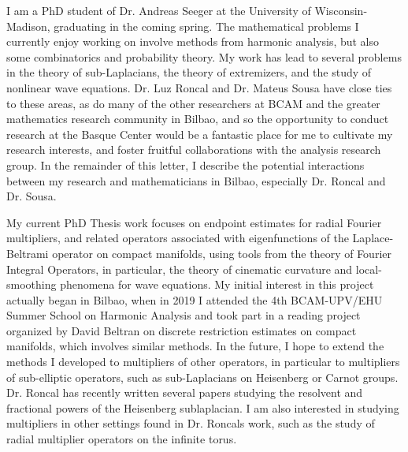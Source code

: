 \documentclass[12pt,stdletter,orderfromtodate,sigleft]{newlfm}
\begin{document}
\begin{newlfm}

\begin{spacing}{1.13}

I am a PhD student of Dr. Andreas Seeger at the University of Wisconsin-Madison, graduating in the coming spring. The mathematical problems I currently enjoy working on involve methods from harmonic analysis, but also some combinatorics and probability theory. My work has lead to several problems in the theory of sub-Laplacians, the theory of extremizers, and the study of nonlinear wave equations. Dr. Luz Roncal and Dr. Mateus Sousa have close ties to these areas, as do many of the other researchers at BCAM and the greater mathematics research community in Bilbao, and so the opportunity to conduct research at the Basque Center would be a fantastic place for me to cultivate my research interests, and foster fruitful collaborations with the analysis research group. In the remainder of this letter, I describe the potential interactions between my research and mathematicians in Bilbao, especially Dr. Roncal and Dr. Sousa.

My current PhD Thesis work focuses on endpoint estimates for radial Fourier multipliers, and related operators associated with eigenfunctions of the Laplace-Beltrami operator on compact manifolds, using tools from the theory of Fourier Integral Operators, in particular, the theory of cinematic curvature and local-smoothing phenomena for wave equations. My initial interest in this project actually began in Bilbao, when in 2019 I attended the 4th BCAM-UPV{\slash}EHU Summer School on Harmonic Analysis  and took part in a reading project organized by David Beltran on discrete restriction estimates on compact manifolds, which involves similar methods. In the future, I hope to extend the methods I developed to multipliers of other operators, in particular to multipliers of sub-elliptic operators, such as sub-Laplacians on Heisenberg or Carnot groups. Dr. Roncal has recently written several papers studying the resolvent and fractional powers of the Heisenberg sublaplacian. I am also interested in studying multipliers in other settings found in Dr. Roncals work, such as the study of radial multiplier operators on the infinite torus.



\end{spacing}
\end{newlfm}
\end{document}
